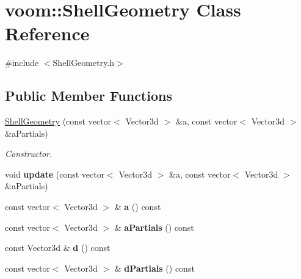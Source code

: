 \hypertarget{classvoom_1_1_shell_geometry}{
\section{voom::ShellGeometry Class Reference}
\label{classvoom_1_1_shell_geometry}
}


{\ttfamily \#include $<$ShellGeometry.h$>$}\subsection*{Public Member Functions}
\begin{DoxyCompactItemize}
\item 
\hypertarget{classvoom_1_1_shell_geometry_a2ec054ddc9f0004c9d18c8f925d2fc5b}{
\hyperlink{classvoom_1_1_shell_geometry_a2ec054ddc9f0004c9d18c8f925d2fc5b}{ShellGeometry} (const vector$<$ Vector3d $>$ \&a, const vector$<$ Vector3d $>$ \&aPartials)}
\label{classvoom_1_1_shell_geometry_a2ec054ddc9f0004c9d18c8f925d2fc5b}

\begin{DoxyCompactList}\small\item\em Constructor. \item\end{DoxyCompactList}\item 
\hypertarget{classvoom_1_1_shell_geometry_ae2344ec3628cfb648010cf85afbb0e23}{
void {\bfseries update} (const vector$<$ Vector3d $>$ \&a, const vector$<$ Vector3d $>$ \&aPartials)}
\label{classvoom_1_1_shell_geometry_ae2344ec3628cfb648010cf85afbb0e23}

\item 
\hypertarget{classvoom_1_1_shell_geometry_ac53e8b38278162d82fe0e6ba414db09b}{
const vector$<$ Vector3d $>$ \& {\bfseries a} () const }
\label{classvoom_1_1_shell_geometry_ac53e8b38278162d82fe0e6ba414db09b}

\item 
\hypertarget{classvoom_1_1_shell_geometry_aa765688d33ad88c856f86a081c1399f5}{
const vector$<$ Vector3d $>$ \& {\bfseries aPartials} () const }
\label{classvoom_1_1_shell_geometry_aa765688d33ad88c856f86a081c1399f5}

\item 
\hypertarget{classvoom_1_1_shell_geometry_ae883b708ee97dc294969d306b7ba5e9f}{
const Vector3d \& {\bfseries d} () const }
\label{classvoom_1_1_shell_geometry_ae883b708ee97dc294969d306b7ba5e9f}

\item 
\hypertarget{classvoom_1_1_shell_geometry_a246a53196c42550edf422a35fb154a74}{
const vector$<$ Vector3d $>$ \& {\bfseries dPartials} () const }
\label{classvoom_1_1_shell_geometry_a246a53196c42550edf422a35fb154a74}


\end{DoxyCompactItemize}
